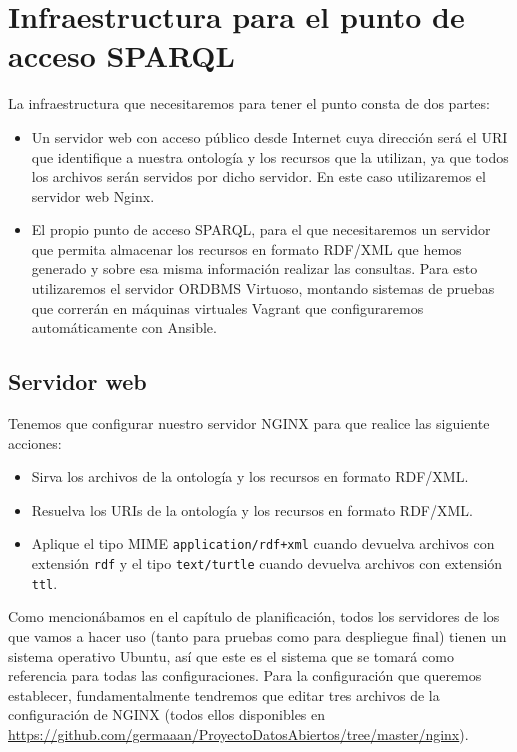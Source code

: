 \section{Infraestructura para el punto de acceso SPARQL}

La infraestructura que necesitaremos para tener el punto consta de dos partes: 

\begin{itemize}
	\item Un servidor web con acceso público desde {\sf Internet} cuya dirección será el {\sf URI} que identifique a nuestra ontología y los recursos que la utilizan, ya que todos los archivos serán servidos por dicho servidor. En este caso utilizaremos el servidor web {\sf Nginx}.
	\item El propio punto de acceso {\sf SPARQL},  para el que necesitaremos un servidor que permita almacenar los recursos en formato {\sf RDF/XML} que hemos generado y sobre esa misma información realizar las consultas. Para esto utilizaremos el servidor {\sf ORDBMS} {\sf Virtuoso}, montando sistemas de pruebas que correrán en máquinas virtuales {\sf Vagrant} que configuraremos automáticamente con {\sf Ansible}.
\end{itemize}

\subsection{Servidor web}

Tenemos que configurar nuestro servidor {\sf NGINX} para que realice las siguiente acciones:

\begin{itemize}
	\item Sirva los archivos de la ontología y los recursos en formato {\sf RDF/XML}.
	\item Resuelva los {\sf URIs} de la ontología y los recursos en formato {\sf RDF/XML}.
	\item Aplique el tipo {\sf MIME} {\tt application/rdf+xml} cuando devuelva archivos con extensión {\tt rdf} y el tipo {\tt text/turtle} cuando devuelva archivos con extensión {\tt ttl}.
\end{itemize}

Como mencionábamos en el capítulo de planificación, todos los servidores de los que vamos a hacer uso (tanto para pruebas como para despliegue final) tienen un sistema operativo {\sf Ubuntu}, así que este es el sistema que se tomará como referencia para todas las configuraciones. Para la configuración que queremos establecer, fundamentalmente tendremos que editar tres archivos de la configuración de {\sf NGINX} (todos ellos disponibles en \url{https://github.com/germaaan/ProyectoDatosAbiertos/tree/master/nginx}).

